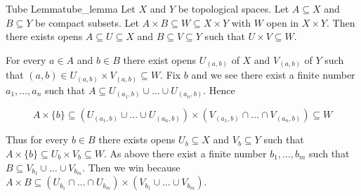 \documentclass{report}
\begin{document}
\begin{lemma}{Tube Lemma}{tube_lemma}
	 Let $X$ and $Y$ be topological spaces. Let $A \subseteq X$ and $B \subseteq Y$ be compact subsets. Let $A \times B \subseteq W \subseteq X \times Y$ with $W$ open in $X \times Y$. Then there exists opens $A \subseteq U \subseteq X$ and $B \subseteq V \subseteq Y$ such that $U \times V \subseteq W$.
\end{lemma}
\begin{prf}
	For every $a \in A$ and $b \in B$ there exist opens $U_{(a, b)}$ of $X$ and $V_{(a, b)}$ of $Y$ such that $(a, b) \in U_{(a, b)} \times V_{(a, b)} \subseteq W$. Fix $b$ and we see there exist a finite number $a_1, \ldots, a_n$ such that $A \subseteq U_{\left(a_1, b\right)} \cup \ldots \cup U_{\left(a_n, b\right)}$. Hence

$$
A \times\{b\} \subseteq \left(U_{\left(a_1, b\right)} \cup \ldots \cup U_{\left(a_n, b\right)}\right) \times\left(V_{\left(a_1, b\right)} \cap \ldots \cap V_{\left(a_n, b\right)}\right) \subseteq W
$$


Thus for every $b \in B$ there exists opens $U_b \subseteq X$ and $V_b \subseteq Y$ such that $A \times\{b\} \subseteq U_b \times V_b \subseteq W$. As above there exist a finite number $b_1, \ldots, b_m$ such that $B \subseteq V_{b_1} \cup \ldots \cup V_{b_m}$. Then we win because $A \times B \subseteq \left(U_{b_1} \cap \ldots \cap U_{b_m}\right) \times\left(V_{b_1} \cup \ldots \cup V_{b_m}\right)$.
\end{prf}
\end{document}
